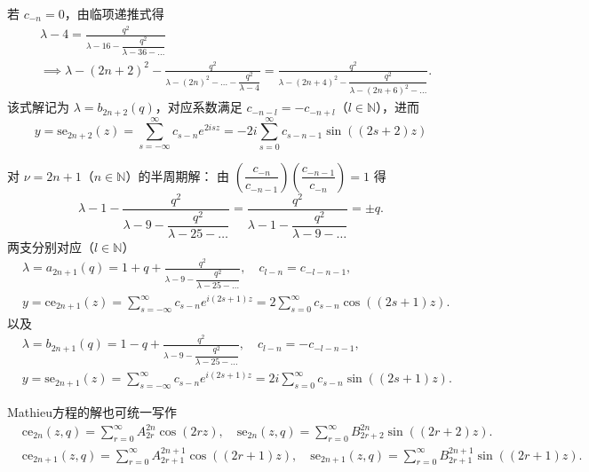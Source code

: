 若 \(c_{-n} = 0\)，由临项递推式得
\begin{align*}
	 & \lambda - 4 = \frac{q^2}{\lambda - 16 - \dfrac{q^2}{\lambda - 36 - \dots}}                                                                                                      \\
	 & \implies \lambda - (2n + 2)^2 - \frac{q^2}{\lambda - (2n)^2 - \dots - \dfrac{q^2}{\lambda - 4}} = \frac{q^2}{\lambda - (2n + 4)^2 - \dfrac{q^2}{\lambda - (2n + 6)^2 - \dots}}.
\end{align*}
该式解记为 \(\lambda = b_{2n+2}(q)\)，对应系数满足 \(c_{-n-l} = -c_{-n+l}\)（\(l \in \mathbb{N}\)），进而
\begin{equation*}
	y = \mathrm{se}_{2n+2}(z) = \sum_{s=-\infty}^{\infty} c_{s-n} e^{2isz} = -2i \sum_{s=0}^{\infty} c_{s-n-1} \sin((2s + 2)z)
\end{equation*}

对 \(\nu = 2n + 1\)（\(n \in \mathbb{N}\)）的半周期解：
由 \(\left( \dfrac{c_{-n}}{c_{-n-1}} \right) \left( \dfrac{c_{-n-1}}{c_{-n}} \right) = 1\) 得
\begin{equation*}
	\lambda - 1 - \frac{q^2}{\lambda - 9 - \dfrac{q^2}{\lambda - 25 - \dots}} = \frac{q^2}{\lambda - 1 - \dfrac{q^2}{\lambda - 9 - \dots}} = \pm q.
\end{equation*}
两支分别对应（\(l \in \mathbb{N}\)）
\begin{align*}
	 & \lambda = a_{2n+1}(q) = 1 + q + \frac{q^2}{\lambda - 9 - \dfrac{q^2}{\lambda - 25 - \dots}}, \quad c_{l-n} = c_{-l-n-1},      \\
	 & y = \mathrm{ce}_{2n+1}(z) = \sum_{s=-\infty}^{\infty} c_{s-n} e^{i(2s + 1)z} = 2 \sum_{s=0}^{\infty} c_{s-n} \cos((2s + 1)z).
\end{align*}
以及
\begin{align*}
	 & \lambda = b_{2n+1}(q) = 1 - q + \frac{q^2}{\lambda - 9 - \dfrac{q^2}{\lambda - 25 - \dots}}, \quad c_{l-n} = -c_{-l-n-1},      \\
	 & y = \mathrm{se}_{2n+1}(z) = \sum_{s=-\infty}^{\infty} c_{s-n} e^{i(2s + 1)z} = 2i \sum_{s=0}^{\infty} c_{s-n} \sin((2s + 1)z).
\end{align*}

Mathieu方程的解也可统一写作
\begin{align*}
	 & \mathrm{ce}_{2n}(z, q) = \sum_{r=0}^{\infty} A_{2r}^{2n} \cos(2rz), \quad
	\mathrm{se}_{2n}(z, q) = \sum_{r=0}^{\infty} B_{2r+2}^{2n} \sin((2r + 2)z).              \\
	 & \mathrm{ce}_{2n+1}(z, q) = \sum_{r=0}^{\infty} A_{2r+1}^{2n+1} \cos((2r + 1)z), \quad
	\mathrm{se}_{2n+1}(z, q) = \sum_{r=0}^{\infty} B_{2r+1}^{2n+1} \sin((2r + 1)z).
\end{align*}

